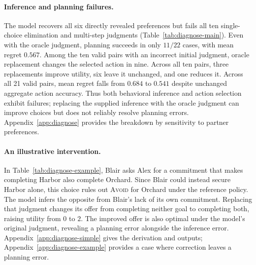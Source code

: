 \paragraph{Inference and planning failures.}
The model recovers all six directly revealed preferences but fails all ten
single-choice elimination and multi-step judgments
(Table~\ref{tab:diagnose-main}). Even with the oracle judgment, planning succeeds
in only $11/22$ cases, with mean regret $0.567$. Among the ten valid pairs
with an incorrect initial judgment, oracle replacement changes the selected
action in nine. Across all ten pairs, three replacements improve utility,
six leave it unchanged, and one reduces it. Across all 21 valid pairs, mean
regret falls from $0.684$ to $0.541$ despite unchanged aggregate action
accuracy. Thus both behavioral inference and action selection exhibit
failures; replacing the supplied inference with the oracle judgment can
improve choices but does not reliably resolve planning errors. Appendix~\ref{app:diagnose} provides
the breakdown by sensitivity to partner preferences.

\paragraph{An illustrative intervention.}
In Table~\ref{tab:diagnose-example}, Blair asks Alex for a commitment that
makes completing Harbor also complete Orchard. Since Blair could instead
secure Harbor alone, this choice rules out \textsc{Avoid} for Orchard under
the reference policy. The model infers the opposite from Blair's lack of
its own commitment. Replacing that judgment changes its offer from
completing neither goal to completing both, raising utility from $0$ to $2$.
The improved offer is also optimal under the model's original judgment, revealing a planning error alongside the inference error.
Appendix~\ref{app:diagnose-simple} gives the derivation and outputs;
Appendix~\ref{app:diagnose-example} provides a case where correction leaves
a planning error.

